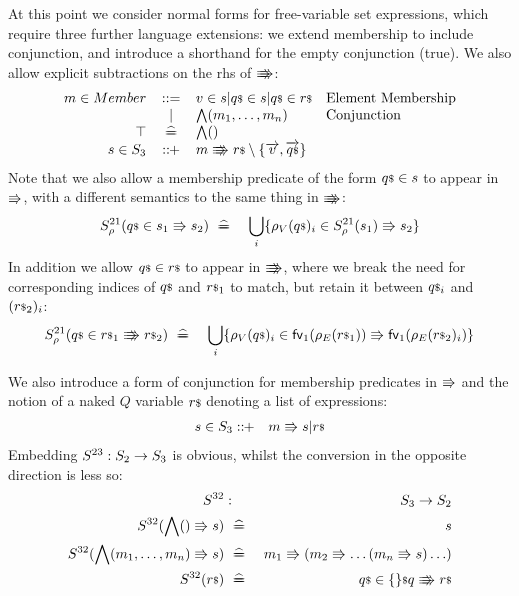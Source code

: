 At this point we consider normal forms for free-variable
set expressions, which require three further
language extensions:
we extend membership to include conjunction,
and introduce a shorthand for the empty conjunction (true).
We also allow explicit subtractions on the rhs of $\Rrightarrow\mkern-14mu\Rrightarrow$:
$$\begin{array}{rcll}
  m \in Member  & ::= & v \in s | \lst q \in s | \lst q \in \lst r & \mbox{Element Membership}
\\              &  |  & \bigwedge (m_1,\ldots,m_n) & \mbox{Conjunction}
\\ \top &\defs& \bigwedge()
\\ s \in S_3 &::\!\!+& m \ssthen \lst r \setminus \setof{\vec v,\lstvec q}
\end{array}$$
Note that we also allow a membership predicate of the form ${q}{\scriptstyle\$} \in s$
to appear in $\Rrightarrow$, with a different semantics to the same thing in $\Rrightarrow\mkern-14mu\Rrightarrow$:
\begin{eqnarray*}
   S^{21}_\rho({q}{\scriptstyle\$} \in s_1 \Rrightarrow s_2)
    &\mathrel{~\widehat{=\!\!\!\!=}}~&
    \bigcup_i
    \{  \rho_V({q}{\scriptstyle\$})_i \in S^{21}_\rho(s_1) \Rrightarrow s_2 \}
\end{eqnarray*}
In addition we allow ${q}{\scriptstyle\$} \in {r}{\scriptstyle\$}$ to appear in $\Rrightarrow\mkern-14mu\Rrightarrow$,
where we break the need for corresponding indices of ${q}{\scriptstyle\$}$ and ${r}{\scriptstyle\$}_1$ to match,
but retain it between ${q}{\scriptstyle\$}_i$ and $({r}{\scriptstyle\$}_2)_i$:
\begin{eqnarray*}
   S^{21}_\rho({q}{\scriptstyle\$} \in {r}{\scriptstyle\$}_1 \Rrightarrow\mkern-14mu\Rrightarrow {r}{\scriptstyle\$}_2)
    &\mathrel{~\widehat{=\!\!\!\!=}}~&
    \bigcup_i
    \{  \rho_V({q}{\scriptstyle\$})_i \in\mathsf{fv}_1(\rho_E({r}{\scriptstyle\$}_1)) \Rrightarrow \mathsf{fv}_1(\rho_E({r}{\scriptstyle\$}_2)_i) \}
\end{eqnarray*}

We also introduce
a form of conjunction for membership predicates in $\Rrightarrow$
and the notion of  a naked $Q$ variable ${r}{\scriptstyle\$}$ denoting a list of expressions:
\begin{eqnarray*}
   s \in S_3 &::\!\!+& m \Rrightarrow s |  {r}{\scriptstyle\$}
\end{eqnarray*}
Embedding $S^{23} : S_2 \rightarrow S_3$ is obvious,
whilst the conversion in the opposite direction is less so:
\begin{eqnarray*}
   S^{32} &:& S_3 \fun S_2
\\ S^{32}(\bigwedge () \sthen s)
   &\defs&
   s
\\ S^{32}(\bigwedge (m_1,\ldots,m_n) \sthen s)
   &\defs&
   m_1 \sthen (m_2 \sthen \ldots (m_n \sthen s)\ldots)
\\ S^{32}(\lst r) &\defs& \lst q \in \setof \lst q \ssthen \lst r
\end{eqnarray*}

